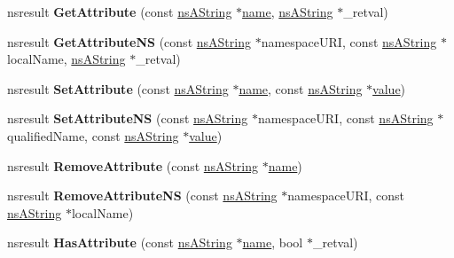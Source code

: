 \begin{DoxyCompactItemize}
nsresult {\bfseries Get\+Attribute} (const \hyperlink{structns_string_container}{ns\+A\+String} $\ast$\hyperlink{structname}{name}, \hyperlink{structns_string_container}{ns\+A\+String} $\ast$\+\_\+retval)
\item 
\mbox{\label{interfacens_i_d_o_m_element_a6776244bdfbfc324df5b96df2b9af99b}} 
nsresult {\bfseries Get\+Attribute\+NS} (const \hyperlink{structns_string_container}{ns\+A\+String} $\ast$namespace\+U\+RI, const \hyperlink{structns_string_container}{ns\+A\+String} $\ast$local\+Name, \hyperlink{structns_string_container}{ns\+A\+String} $\ast$\+\_\+retval)
\item 
\mbox{\label{interfacens_i_d_o_m_element_a8160e86a5e2bba4d0f4c71b1602a1911}} 
nsresult {\bfseries Set\+Attribute} (const \hyperlink{structns_string_container}{ns\+A\+String} $\ast$\hyperlink{structname}{name}, const \hyperlink{structns_string_container}{ns\+A\+String} $\ast$\hyperlink{unionvalue}{value})
\item 
\mbox{\label{interfacens_i_d_o_m_element_ae0d9698e065ceb1e386846094accbc7e}} 
nsresult {\bfseries Set\+Attribute\+NS} (const \hyperlink{structns_string_container}{ns\+A\+String} $\ast$namespace\+U\+RI, const \hyperlink{structns_string_container}{ns\+A\+String} $\ast$qualified\+Name, const \hyperlink{structns_string_container}{ns\+A\+String} $\ast$\hyperlink{unionvalue}{value})
\item 
\mbox{\label{interfacens_i_d_o_m_element_aca37b47c0926dc93cd44949e35e28f48}} 
nsresult {\bfseries Remove\+Attribute} (const \hyperlink{structns_string_container}{ns\+A\+String} $\ast$\hyperlink{structname}{name})
\item 
\mbox{\label{interfacens_i_d_o_m_element_a5c03f9714b776d26f722841543c5c886}} 
nsresult {\bfseries Remove\+Attribute\+NS} (const \hyperlink{structns_string_container}{ns\+A\+String} $\ast$namespace\+U\+RI, const \hyperlink{structns_string_container}{ns\+A\+String} $\ast$local\+Name)
\item 
\mbox{\label{interfacens_i_d_o_m_element_a01933f0389c964764d14c4b8c7b54eb5}} 
nsresult {\bfseries Has\+Attribute} (const \hyperlink{structns_string_container}{ns\+A\+String} $\ast$\hyperlink{structname}{name}, bool $\ast$\+\_\+retval)

\end{DoxyCompactItemize}
